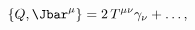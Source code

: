 \begin{equation}
 \label{eq:susy_current}
 \{Q, \Jbar^{\mu}\}=2\,T^{\mu\nu}\gamma_\nu+\dots,
\end{equation}

